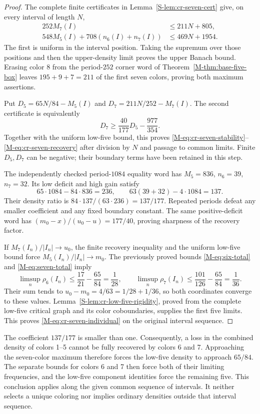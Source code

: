 \documentclass[11pt,reqno]{amsart}
\theoremstyle{plain}
\theoremstyle{plain}
\theoremstyle{plain}
\begin{document}
\begin{proof}
The complete finite certificates in
Lemma~\ref*{S-lem:cr-seven-cert} give, on every interval of length $N$,
\begin{align*}
 252M_7(I)&\le211N+805,\\
 548M_5(I)+708(n_6(I)+n_7(I))&\le469N+1954.
\end{align*}
The first is uniform in the interval position. Taking the supremum
over those positions and then the upper-density limit proves the
upper Banach bound. Erasing color $8$ from the period-$252$ corner
word of Theorem~\ref{M-thm:base-five-box} leaves $195+9+7=211$ of the
first seven colors, proving both maximum assertions.

Put $D_5=65N/84-M_5(I)$ and $D_7=211N/252-M_7(I)$. The second
certificate is equivalently
\[
 D_7\ge\frac{40}{177}D_5-\frac{977}{354}.
\]
Together with the uniform low-five bound, this proves
\eqref{M-eq:cr-seven-stability}--\eqref{M-eq:cr-seven-recovery} after
division by $N$ and passage to common limits. Finite $D_5,D_7$ can
be negative; their boundary terms have been retained in this step.

The independently checked period-$1084$ equality word has
$M_5=836$, $n_6=39$, $n_7=32$. Its low deficit and high gain satisfy
\[
 65\cdot1084-84\cdot836=236,\qquad
 63(39+32)-4\cdot1084=137.
\]
Their density ratio is $84\cdot137/(63\cdot236)=137/177$.
Repeated periods defeat any smaller coefficient and any fixed
boundary constant. The same positive-deficit word has
$(m_0-x)/(u_0-u)=177/40$, proving sharpness of the recovery factor.

If $M_7(I_n)/|I_n|\to u_0$, the finite recovery inequality and the
uniform low-five bound force $M_5(I_n)/|I_n|\to m_0$. The previously
proved bounds \eqref{M-eq:six-total} and \eqref{M-eq:seven-total} imply
\[
 \limsup_n\rho_6(I_n)\le\frac{17}{21}-\frac{65}{84}=\frac1{28},
 \qquad
 \limsup_n\rho_7(I_n)\le\frac{101}{126}-\frac{65}{84}=\frac1{36}.
\]
Their sum tends to $u_0-m_0=4/63=1/28+1/36$, so both coordinates
converge to these values. Lemma~\ref*{S-lem:cr-low-five-rigidity}, proved
from the complete low-five critical graph and its color coboundaries,
supplies the first five limits. This proves
\eqref{M-eq:cr-seven-individual} on the original interval sequence.
\end{proof}

The coefficient $137/177$ is smaller than one. Consequently, a loss in the
combined density of colors 1--5 cannot be fully recovered by colors 6 and 7.
Approaching the seven-color maximum therefore forces the low-five density
to approach $65/84$. The separate bounds for colors 6 and 7 then force
both of their limiting frequencies, and the low-five component identities
force the remaining five. This conclusion applies along the given common
sequence of intervals. It neither selects a unique coloring nor implies
ordinary densities outside that interval sequence.
\end{document}
